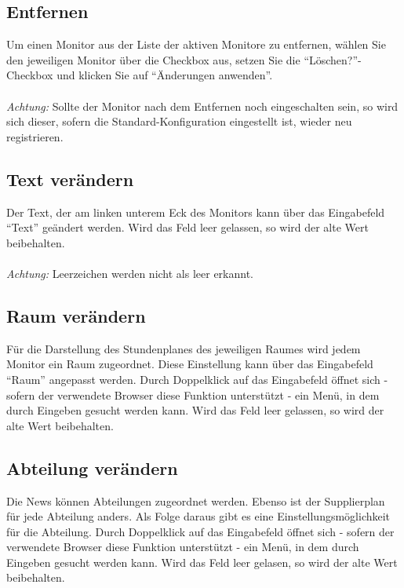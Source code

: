 \subsection{Entfernen}

Um einen Monitor aus der Liste der aktiven Monitore zu entfernen, wählen Sie den jeweiligen Monitor über die Checkbox aus, setzen Sie die \enquote{Löschen?}-Checkbox und klicken Sie auf \enquote{Änderungen anwenden}.\\
\\
\textit{Achtung:} Sollte der Monitor nach dem Entfernen noch eingeschalten sein, so wird sich dieser, sofern die Standard-Konfiguration eingestellt ist, wieder neu registrieren.

\subsection{Text verändern}

Der Text, der am linken unterem Eck des Monitors kann über das Eingabefeld \enquote{Text} geändert werden. Wird das Feld leer gelassen, so wird der alte Wert beibehalten.\\
\\
\textit{Achtung:} Leerzeichen werden nicht als leer erkannt.

\subsection{Raum verändern}

Für die Darstellung des Stundenplanes des jeweiligen Raumes wird jedem Monitor ein Raum zugeordnet. Diese Einstellung kann über das Eingabefeld \enquote{Raum} angepasst werden. Durch Doppelklick auf das Eingabefeld öffnet sich - sofern der verwendete Browser diese Funktion unterstützt - ein Menü, in dem durch Eingeben gesucht werden kann. Wird das Feld leer gelassen, so wird der alte Wert beibehalten.

\subsection{Abteilung verändern}

Die News können Abteilungen zugeordnet werden. Ebenso ist der Supplierplan für jede Abteilung anders. Als Folge daraus gibt es eine Einstellungsmöglichkeit für die Abteilung. Durch Doppelklick auf das Eingabefeld öffnet sich - sofern der verwendete Browser diese Funktion unterstützt - ein Menü, in dem durch Eingeben gesucht werden kann. Wird das Feld leer gelasen, so wird der alte Wert beibehalten.

